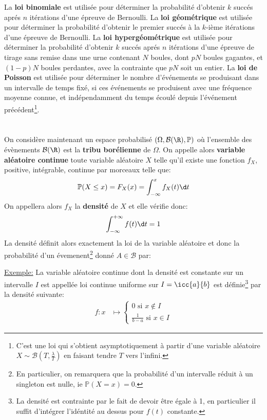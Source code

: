 La \textbf{loi binomiale} est utilisée pour déterminer la probabilité d'obtenir \(k\) succés aprés \(n\) itérations d'une épreuve de Bernoulli. \+
La \textbf{loi géométrique} est utilisée pour déterminer la probabilité d'obtenir le premier succés à la \(k\)-ième itérations d'une épreuve de Bernoulli.\+
La \textbf{loi hypergéométrique} est utilisée pour déterminer la probabilité d'obtenir \(k\) succés aprés \(n\) itérations d'une épreuve de tirage sans remise dans une urne contenant \(N\) boules, dont \(pN\) boules gagantes, et \((1-p)N\) boules perdantes, avec la contrainte que \(pN\) soit un entier.\+
La \textbf{loi de Poisson} est utilisée pour déterminer le nombre d'événements se produisant dans un intervalle de temps fixé, si ces événements se produisent avec une fréquence moyenne connue, et indépendamment du temps écoulé depuis l'événement précédent\footnote[2]{C'est une loi qui s'obtient asymptotiquement à partir d'une variable aléatoire \(X \sim \mathcal{B}(T, \frac{\lambda}{T})\) en faisant tendre \(T\) vers l'infini.}.\+
\chapter*{} %
On considère maintenant un espace probabilisé \((\Omega, \mathcal{B}(\R), \mathbb{P})\) où l'ensemble des évènements \(\mathcal{B}(\R)\) est la \textbf{tribu borélienne} de \(\Omega\).\+
On appelle alors \textbf{variable aléatoire continue} toute variable aléatoire \(X\) telle qu'il existe une fonction \(f_X\), positive, intégrable, continue par morceaux telle que:
\[
   \mathbb{P}(X \leq x) = F_X(x) = \int_{-\infty}^{x} f_X(t) \d t   
\]
On appellera alors \(f_X\) la \textbf{densité} de \(X\) et elle vérifie donc:
\[
   \int_{-\infty}^{+\infty} f(t) \d t = 1
\]
La densité définit alors exactement la  loi de la variable aléatoire et donc la probabilité d'un évemenent\footnote[1]{En particulier, on remarquera que la probabilité d'un intervalle réduit à un singleton est nulle, ie \(\mathbb{P}(X = x) = 0\).} donné \(A \in \mathscr{B}\) par:

\underline{Exemple:} La variable aléatoire continue dont la densité est constante sur
un intervalle \(I\)  est appellée loi continue uniforme sur \(I = \icc{a}{b}\) est définie\footnote[2]{La densité est contrainte par le fait de devoir être égale à 1, en particulier il suffit d'intégrer l'idéntité au dessus pour \(f(t)\) constante.} par la densité suivante:
\[
   \begin{aligned}
      f: x &\longmapsto \begin{cases}
         0 \text{ si } x  \notin I\\
         \frac{1}{b - a} \text{ si } x \in I
      \end{cases}
   \end{aligned}
\]


